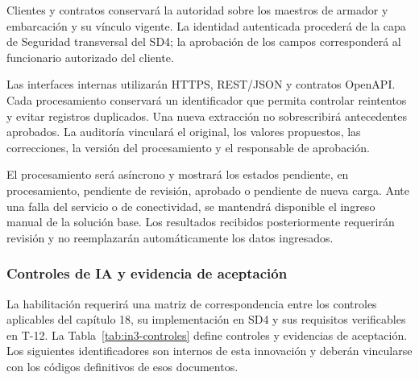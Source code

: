 Clientes y contratos conservará la autoridad sobre los maestros de
armador y embarcación y su vínculo vigente. La identidad autenticada
procederá de la capa de Seguridad transversal del SD4; la aprobación
de los campos corresponderá al funcionario autorizado del cliente.

Las interfaces internas utilizarán HTTPS, REST/JSON y contratos
OpenAPI. Cada procesamiento conservará un identificador que permita
controlar reintentos y evitar registros duplicados. Una nueva
extracción no sobrescribirá antecedentes aprobados. La auditoría
vinculará el original, los valores propuestos, las correcciones,
la versión del procesamiento y el responsable de aprobación.

El procesamiento será asíncrono y mostrará los estados pendiente,
en procesamiento, pendiente de revisión, aprobado o pendiente de
nueva carga. Ante una falla del servicio o de conectividad,
se mantendrá disponible el ingreso manual de la solución base.
Los resultados recibidos posteriormente requerirán revisión y
no reemplazarán automáticamente los datos ingresados.

\subsubsection{Controles de IA y evidencia de aceptación}

La habilitación requerirá una matriz de correspondencia entre
los controles aplicables del capítulo 18, su implementación
en SD4 y sus requisitos verificables en T-12. La Tabla~\ref{tab:in3-controles} define controles y evidencias de aceptación. Los siguientes
identificadores son internos de esta innovación y deberán
vincularse con los códigos definitivos de esos documentos.

